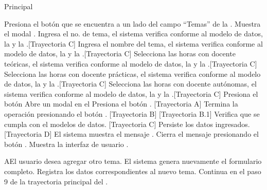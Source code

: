 \begin{UCtrayectoria}{Principal}

     \UCpaso[\UCactor] Presiona el botón \BtnModal que se encuentra a un lado del campo ``Temas'' de la .
    \UCpaso Muestra el modal .
    \UCpaso[\UCactor] Ingresa el no. de tema, el sistema verifica conforme al modelo de datos, la  y la .[Trayectoria C]
    \UCpaso[\UCactor] Ingresa el nombre del tema, el sistema verifica conforme al modelo de datos, la  y la .[Trayectoria C]
    \UCpaso[\UCactor] Selecciona las horas con docente teóricas, el sistema verifica conforme al modelo de datos, la  y la .[Trayectoria C]
    \UCpaso[\UCactor] Selecciona las horas con docente prácticas, el sistema verifica conforme al modelo de datos, la  y la .[Trayectoria C]
    \UCpaso[\UCactor] Selecciona las horas con docente autónomas, el sistema verifica conforme al modelo de datos, la  y la .[Trayectoria C]
    \UCpaso[\UCactor] Presiona el botón 
    \UCpaso Abre un modal en el 
    \UCpaso[\UCactor] Presiona el botón . [Trayectoria A]
    \UCpaso[\UCactor] Termina la operación presionando el botón . [Trayectoria B] [Trayectoria B.1]
	\UCpaso Verifica que se cumpla con el modelos de datos. [Trayectoria C]
	\UCpaso Persiste los datos ingresados. [Trayectoria D]
	\UCpaso El sistema muestra el mensaje .
	\UCpaso[\UCactor] Cierra el mensaje presionando el botón .
	\UCpaso Muestra la interfaz de usuario .
\end{UCtrayectoria}


\begin{UCtrayectoriaA}{A}{El usuario desea agregar otro tema.}
    \UCpaso El sistema genera nuevamente el formulario completo.
    \UCpaso[\UCactor] Registra los datos correspondientes al nuevo tema.
    \UCpaso Continua en el paso 9 de la trayectoria principal del .

\end{UCtrayectoriaA}

